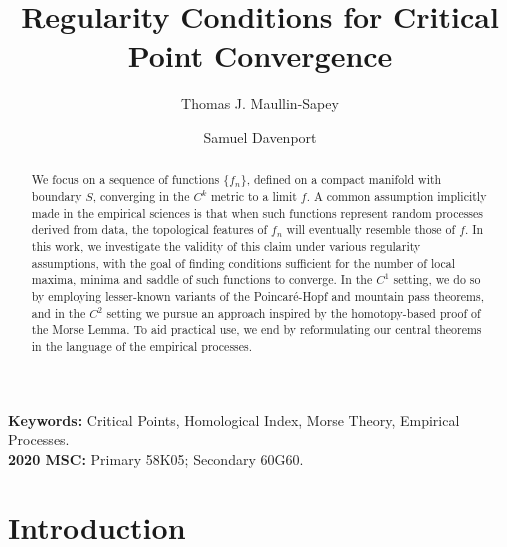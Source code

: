 \documentclass[11pt]{article}
\newcommand{\1}{\mathbf{1}}
\theoremstyle{definition}
\theoremstyle{remark}
\begin{document}
\title{Regularity Conditions for Critical Point Convergence}

\author[1]{Thomas J. Maullin-Sapey}
\author[2]{Samuel Davenport}
\date{}
\maketitle

\begin{abstract}
We focus on a sequence of functions $\{f_n\}$, defined on a compact manifold with boundary $S$, converging in the $C^k$ metric to a limit $f$. A common assumption implicitly made in the empirical sciences is that when such functions represent random processes derived from data, the topological features of $f_n$ will eventually resemble those of $f$. In this work, we investigate the validity of this claim under various regularity assumptions, with the goal of finding conditions sufficient for the number of local maxima, minima and saddle of such functions to converge. In the $C^1$ setting, we do so by employing lesser-known variants of the Poincar\'{e}-Hopf and mountain pass theorems, and in the $C^2$ setting we pursue an approach inspired by the homotopy-based proof of the Morse Lemma. To aid practical use, we end by reformulating our central theorems in the language of the empirical processes.
\end{abstract}

\noindent\textbf{Keywords:} Critical Points, Homological Index, Morse Theory, Empirical Processes.\\
\noindent\textbf{2020 MSC:} Primary 58K05; Secondary 60G60.


\section{Introduction}
\end{document}
